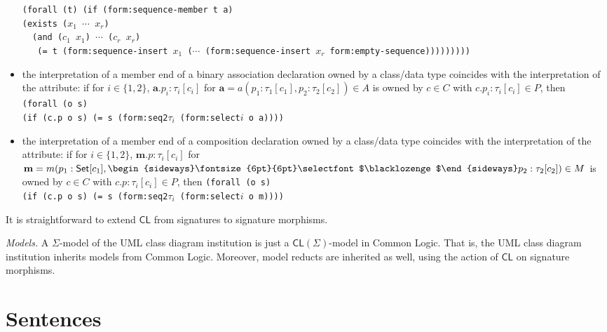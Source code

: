 \documentclass[10pt,fleqn,%
\ifpretendfinal
final%
\else
draft%
\fi,
]{scrreprt}
\newcommand*{\CL}{\ensuremath{\mathsf{CL}}\xspace}
\newcommand{\composition}{\raisebox{0.2pt}{\begin{sideways}\fontsize{6pt}{6pt}\selectfont$\blacklozenge$\end{sideways}}}
\newcommand{\white}[1]{{\color{white}{#1}}}
\newcommand{\qqquad}{\white{x}\qquad}
\begin{document}
\begin{itemize}
\texttt{(forall (t) (if (form:sequence-member t a)\\
\qqquad\qqquad  (exists ($x_1$ $\cdots$ $x_r$)\\
\qqquad\qqquad\qqquad\ \  (and ($c_1$ $x_1$) $\cdots$ ($c_r$ $x_r$)\\
\ \ \  (= t (form:sequence-insert $x_1$ ($\cdots$ (form:sequence-insert $x_r$ form:empty-sequence)))))))))}
\item the interpretation of a member end of a binary association
declaration owned by a class/data type coincides with the interpretation
of the attribute: if for $i\in\{1,2\}$, $\mathbf{a}.p_i : \tau_i[c_i]$ for
$\mathbf{a} = a(p_1 : \tau_1[c_1], p_2 : \tau_2[c_2]) \in A$ is owned by
$c \in C$ with $c.p_i : \tau_i[c_i] \in P$, then\\
\texttt{(forall (o s)\\
\qqquad (if (c.p o s) (= s (form:seq2$\tau_i$ (form:select$i$ o a))))} 
\item the interpretation of a member end of a composition declaration
owned by a class/data type coincides with the interpretation of the
attribute: if for $i\in\{1,2\}$, $\mathbf{m}.p : \tau_i[c_i]$ for $\mathbf{m}=m(p_1 : \mathsf{Set}[c_1], \composition p_2 : \tau_2[c_2]) \in M$ is owned
by $c \in C$ with $c.p : \tau_i[c_i] \in P$, then
\texttt{(forall (o s)\\
\qqquad (if (c.p o s) (= s (form:seq2$\tau_i$ (form:select$i$ o m))))} 
\end{itemize}


It is straightforward to extend $\CL$ from signatures to signature morphisms.

\smallskip\noindent
\textit{Models.}
A $\Sigma$-model of the UML class diagram institution is just a
$\CL(\Sigma)$-model in Common Logic. That is, the UML class diagram
institution inherits models from Common Logic. Moreover, model reducts
are inherited as well, using the action of $\CL$ on signature morphisms.


\section{Sentences}
\end{document}
